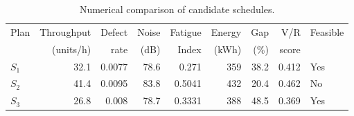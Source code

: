 \begin{table}[htbp]
\centering
\caption{Numerical comparison of candidate schedules.}
\label{tab:numerical-sim}
\small
\begin{tabular}{@{}lrrrrrrrl@{}}
\toprule
Plan & Throughput & Defect & Noise & Fatigue & Energy & Gap & V/R & Feasible \\
     & (units/h)  & rate   & (dB)  & Index   & (kWh)  & (\%) & score &         \\
\midrule
$S_{1}$ & 32.1 & 0.0077 & 78.6 & 0.271 & 359 & 38.2 & 0.412 & Yes \\
$S_{2}$ & 41.4 & 0.0095 & 83.8 & 0.5041 & 432 & 20.4 & 0.462 & No \\
$S_{3}$ & 26.8 & 0.008 & 78.7 & 0.3331 & 388 & 48.5 & 0.369 & Yes \\
\bottomrule
\end{tabular}
\end{table}
